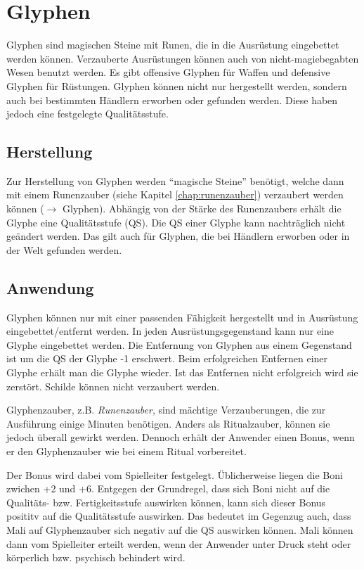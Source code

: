 {\let\clearpage\relax\chapter{Glyphen}}
Glyphen sind magischen Steine mit Runen, die in die Ausrüstung eingebettet werden können. Verzauberte Ausrüstungen können auch von nicht-magiebegabten Wesen benutzt werden. Es gibt offensive Glyphen für Waffen und defensive Glyphen für Rüstungen. Glyphen können nicht nur hergestellt werden, sondern auch bei bestimmten Händlern erworben oder gefunden werden. Diese haben jedoch eine festgelegte Qualitätsstufe.

\section{Herstellung}
Zur Herstellung von Glyphen werden "`magische Steine"' benötigt, welche dann mit einem Runenzauber (siehe Kapitel \ref{chap:runenzauber}) verzaubert werden können ($\rightarrow$ Glyphen). Abhängig von der Stärke des Runenzaubers erhält die Glyphe eine Qualitätsstufe (QS). Die QS einer Glyphe kann nachträglich nicht geändert werden. Das gilt auch für Glyphen, die bei Händlern erworben oder in der Welt gefunden werden.

\section{Anwendung}
Glyphen können nur mit einer passenden Fähigkeit hergestellt und in Ausrüstung eingebettet/entfernt werden. In jeden Ausrüstungsgegenstand kann nur eine Glyphe eingebettet werden. Die Entfernung von Glyphen aus einem Gegenstand ist um die QS der Glyphe -1 erschwert. Beim erfolgreichen Entfernen einer Glyphe erhält man die Glyphe wieder. Ist das Entfernen nicht erfolgreich wird sie zerstört. Schilde können nicht verzaubert werden.

Glyphenzauber, z.B. \textit{Runenzauber}, sind mächtige Verzauberungen, die zur Ausführung einige Minuten benötigen. Anders als Ritualzauber, können sie jedoch überall gewirkt werden. Dennoch erhält der Anwender einen Bonus, wenn er den Glyphenzauber wie bei einem Ritual vorbereitet. 

Der Bonus wird dabei vom Spielleiter festgelegt. Üblicherweise liegen die Boni zwichen +2 und +6. Entgegen der Grundregel, dass sich Boni nicht auf die Qualitäts- bzw. Fertigkeitsstufe auswirken können, kann sich dieser Bonus posititv auf die Qualitätsstufe auswirken. Das bedeutet im Gegenzug auch, dass Mali auf Glyphenzauber sich negativ auf die QS auswirken können. Mali können dann vom Spielleiter erteilt werden, wenn der Anwender unter Druck steht oder körperlich bzw. psychisch behindert wird.

